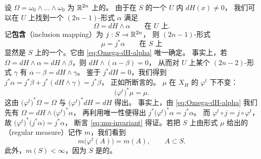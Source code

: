 设 $\Omega=\omega_{0}\wedge\dots\wedge\omega_{0}$ 为 $\mathbb{R}^{2n}$ 上的\trVolumeForm。%
由于在 $S$ 的一个\trNeighborhood{} $U$ 内 $dH(x)\neq0$，%
我们可以在 $U$ 上找到一个 $(2n-1)$-形式 $\alpha$ 满足
\begin{equation}\label{eq:Omega-dH-alpha}
\Omega=dH\wedge\alpha\qquad\text{在 $U$ 上}.
\end{equation}
记\textbf{包含\trMapping}（inclusion mapping）为 $j:S\to\mathbb{R}^{2n}$，%
则 $(2n-1)$-形式
\begin{equation}\label{eq:mu-pullback}
\mu=j^{*}\alpha\qquad\text{在 $S$ 上}
\end{equation}
显然是 $S$ 上的一个\trVolumeForm。它由 \eqref{eq:Omega-dH-alpha} 唯一确定。%
事实上，若 $\Omega=dH\wedge\alpha=dH\wedge\beta$，则 $dH\wedge(\alpha-\beta)=0$，%
从而对 $U$ 上某个 $(2n-2)$-形式 $\gamma$ 有 $\alpha-\beta=dH\wedge\gamma$。%
鉴于 $j^{*}dH=0$，我们得到 $j^{*}\alpha=j^{*}\beta+j^{*}(dH\wedge\gamma)=j^{*}\beta$，%
正如所断言的。\trVolumeForm{} $\mu$ 在 $X_{H}$ 的\trFlow{} $\varphi^{t}$ 下不变：
\begin{equation}\label{eq:mu-invariant}
\bigl(\varphi^{t}\bigr)^{*}\mu=\mu.
\end{equation}
这由 $\bigl(\varphi^{t}\bigr)^{*}\Omega=\Omega$ 与 $\bigl(\varphi^{t}\bigr)^{*}dH=dH$ 得出。%
事实上，由 \eqref{eq:Omega-dH-alpha} 我们先有 $\Omega=dH\wedge\bigl(\varphi^{t}\bigr)^{*}\alpha$，%
再利用唯一性便得出 $j^{*}\bigl(\varphi^{t}\bigr)^{*}\alpha=j^{*}\alpha$。%
而 $\varphi^{t}\circ j=j\circ\varphi^{t}$，故 $\bigl(\varphi^{t}\bigr)^{*}\bigl(j^{*}\alpha\bigr)=j^{*}\alpha$，%
断言 \eqref{eq:mu-invariant} 得证。若把 $S$ 上由形式 $\mu$ 给出的%
\textbf{\trRegular\trMeasure}（regular measure）记作 $m$，我们看到
\begin{equation}\label{eq:measure-invariance}
m\bigl(\varphi^{t}(A)\bigr)=m(A),\qquad A\subset S.
\end{equation}
此外，$m(S)<\infty$，因为 $S$ 是\trCompact{}的。

